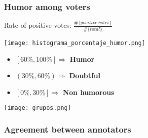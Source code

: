 \begin{frame}[allowframebreaks]
    \frametitle{Humor among voters}

    Rate of positive votes: $\frac{\#\{positive\ votes\}}{\#\{total\}}$ %

    \begin{center}
        \texttt{[image: histograma\_porcentaje\_humor.png]}
    \end{center}

    \begin{itemize}
        \item $[60\%, 100\%] \Rightarrow$ \textbf{Humor}
        \item $(30\%, 60\%) \Rightarrow$ \textbf{Doubtful}
        \item $[0\%, 30\%] \Rightarrow$ \textbf{Non humorous}
    \end{itemize}

    \framebreak{}

    \begin{center}
        \texttt{[image: grupos.png]}
    \end{center}
\end{frame}

\subsubsection{Agreement between annotators}

